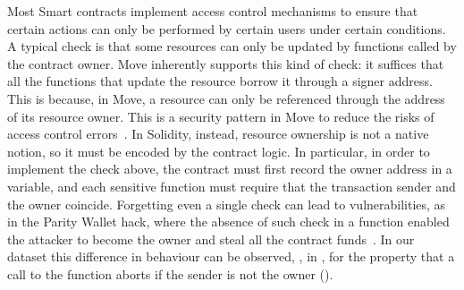 %
Most Smart contracts implement access control mechanisms to ensure that certain actions can only be performed by certain users under certain conditions.
%
A typical check is that some resources can only be updated by functions called by the contract owner.
%
Move inherently supports this kind of check: it suffices that all the functions that update the resource borrow it through a signer address. This is because, in Move, a resource can only be referenced through the address of its resource owner. %
This is a security pattern in Move to reduce the risks of access control errors~\cite{aptos-security-guidelines}.
%
In Solidity, instead, resource ownership is not a native notion, so it must be encoded by the contract logic. In particular, in order to implement the check above, the contract must first record the owner address in a variable, and each sensitive function must require that the transaction sender and the owner coincide. 
Forgetting even a single check can lead to vulnerabilities, as in the Parity Wallet hack, where the absence of such check in a function enabled the attacker to become the owner and steal all the contract funds~\cite{parity-wallet-hack}. 
%
In our dataset this difference in behaviour can be observed, \eg, in  , for the property that  a call to the function  aborts if the sender is not the owner  ().

